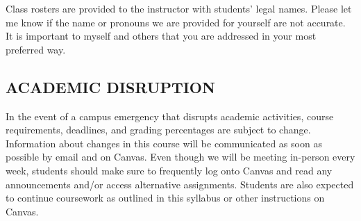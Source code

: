 \documentclass[11pt]{article}
\begin{document}
Class rosters are provided to the instructor with students' legal names.
Please let me know if the name or pronouns we are provided for yourself are not accurate.
It is important to myself and others that you are addressed in your most preferred way.

\subsection*{ACADEMIC DISRUPTION}
In the event of a campus emergency that disrupts academic activities, course requirements, deadlines, and grading percentages are subject to change. 
Information about changes in this course will be communicated as soon as possible by email and on Canvas. 
Even though we will be meeting in-person every week, students should make sure to frequently log onto Canvas and read any announcements and/or access alternative assignments. 
Students are also expected to continue coursework as outlined in this syllabus or other instructions on Canvas. 

\newpage


\end{document}
